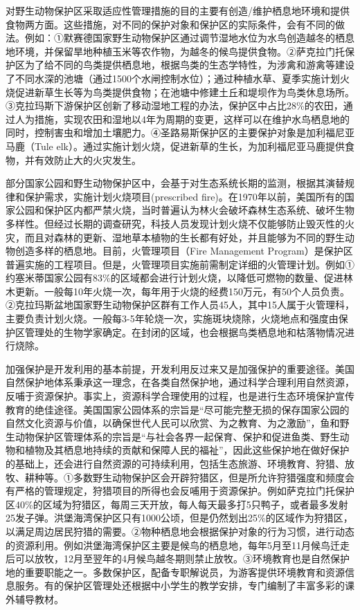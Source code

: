 \documentclass[]{book}
\begin{document}
对野生动物保护区采取适应性管理措施的目的主要有创造/维护栖息地环境和提供食物两方面。这些措施，对不同的保护对象和保护区的实际条件，会有不同的做法。例如：①默赛德国家野生动物保护区通过调节湿地水位为水鸟创造越冬的栖息地环境，并保留旱地种植玉米等农作物，为越冬的候鸟提供食物。②萨克拉门托保护区为了给不同的鸟类提供栖息地，根据鸟类的生态学特性，为涉禽和游禽等建设了不同水深的池塘（通过1500个水闸控制水位）；通过种植水草、夏季实施计划火烧促进新草生长等为鸟类提供食物；在池塘中修建土丘和堤坝作为鸟类休息场所。③克拉玛斯下游保护区创新了移动湿地工程的办法，保护区中占比28\%的农田，通过人为措施，实现农田和湿地以4年为周期的变更，这样可以在维护水鸟栖息地的同时，控制害虫和增加土壤肥力。④圣路易斯保护区的主要保护对象是加利福尼亚马鹿（Tule elk）。通过实施计划火烧，促进新草的生长，为加利福尼亚马鹿提供食物，并有效防止大的火灾发生。

部分国家公园和野生动物保护区中，会基于对生态系统长期的监测，根据其演替规律和保护需求，实施计划火烧项目(prescribed fire)。在1970年以前，美国所有的国家公园和保护区内都严禁火烧，当时普遍认为林火会破坏森林生态系统、破坏生物多样性。但经过长期的调查研究，科技人员发现计划火烧不仅能够防止毁灭性的火灾，而且对森林的更新、湿地草本植物的生长都有好处，并且能够为不同的野生动物创造多样的栖息地。目前，火管理项目（Fire Management Program）是保护区普遍实施的工程项目。但是，火管理项目实施前需制定详细的火管理计划。例如①约塞米蒂国家公园有83\%的区域都会进行计划火烧，以降低可燃物的数量、促进林木更新。一般每10年火烧一次，每年用于火烧的经费150万元，有50个人员负责。②克拉玛斯盆地国家野生动物保护区群有工作人员45人，其中15人属于火管理科，主要负责计划火烧。一般每3-5年轮烧一次，实施斑块烧除，火烧地点和强度由保护区管理处的生物学家确定。在封闭的区域，也会根据鸟类栖息地和枯落物情况进行烧除。

加强保护是开发利用的基本前提，开发利用反过来又是加强保护的重要途径。美国自然保护地体系秉承这一理念，在各类自然保护地，通过科学合理利用自然资源，反哺于资源保护。事实上，资源科学合理使用的过程，也是进行生态环境保护宣传教育的绝佳途径。美国国家公园体系的宗旨是``尽可能完整无损的保存国家公园的自然文化资源与价值，以确保世代人民可以欣赏、为之教育、为之激励''，鱼和野生动物保护区管理体系的宗旨是``与社会各界一起保育、保护和促进鱼类、野生动物和植物及其栖息地持续的贡献和保障人民的福祉''，因此这些保护地在做好保护的基础上，还会进行自然资源的可持续利用，包括生态旅游、环境教育、狩猎、放牧、耕种等。①多数野生动物保护区会开辟狩猎区，但是所允许狩猎强度和频度会有严格的管理规定，狩猎项目的所得也会反哺用于资源保护。例如萨克拉门托保护区40\%的区域为狩猎区，每周三天开放，每人每天最多打5只鸭子，或者最多发射25发子弹。洪堡海湾保护区只有1000公顷，但是仍然划出25\%的区域作为狩猎区，以满足周边居民狩猎的需要。②物种栖息地会根据保护对象的行为习惯，进行动态的资源利用。例如洪堡海湾保护区主要是候鸟的栖息地，每年5月至11月候鸟迁走后可以放牧，12月至翌年的4月候鸟越冬期则禁止放牧。③环境教育也是自然保护地的重要职能之一。多数保护区，配备专职解说员，为游客提供环境教育和资源信息服务。有的保护区管理处还根据中小学生的教学安排，专门编制了丰富多彩的课外辅导教材。
\end{document}
